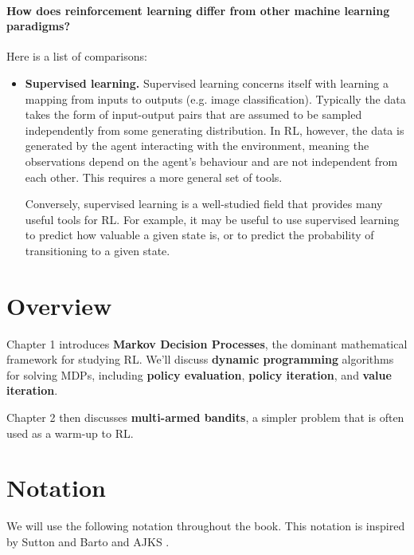 \documentclass[../main/main]{subfiles}
\begin{document}
\paragraph{How does reinforcement learning differ from other machine learning paradigms?} Here is a list of comparisons:

\begin{itemize}
    \item \textbf{Supervised learning.} Supervised learning concerns itself with learning a mapping from inputs to outputs (e.g. image classification). Typically the data takes the form of input-output pairs that are assumed to be sampled independently from some generating distribution. In RL, however, the data is generated by the agent interacting with the environment, meaning the observations depend on the agent's behaviour and are not independent from each other. This requires a more general set of tools.

    Conversely, supervised learning is a well-studied field that provides many useful tools for RL. For example, it may be useful to use supervised learning to predict how valuable a given state is, or to predict the probability of transitioning to a given state.
\end{itemize}

\section{Overview}

Chapter 1 introduces \textbf{Markov Decision Processes}, the dominant mathematical framework for studying RL. We'll discuss \textbf{dynamic programming} algorithms for solving MDPs, including \textbf{policy evaluation}, \textbf{policy iteration}, and \textbf{value iteration}.

Chapter 2 then discusses \textbf{multi-armed bandits}, a simpler problem that is often used as a warm-up to RL.

\section{Notation}

We will use the following notation throughout the book. This notation is inspired by Sutton and Barto  and AJKS .

\end{document}
